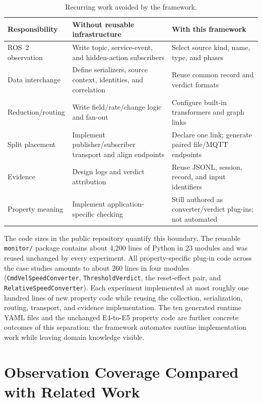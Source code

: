 \begin{table}[htbp]
\centering
\caption{Recurring work avoided by the framework.}
\label{tab:work-saved}
\begin{tabular}{
  >{\raggedright\arraybackslash}p{}
  >{\raggedright\arraybackslash}p{}
  >{\raggedright\arraybackslash}p{}}
\toprule
\textbf{Responsibility} & \textbf{Without reusable infrastructure} &
\textbf{With this framework}\\
\midrule
ROS~2 observation & Write topic, service-event, and hidden-action subscribers &
Select source kind, name, type, and phases\\
Data interchange & Define serializers, source context, identities, and
correlation & Reuse common record and verdict formats\\
Reduction/routing & Write field/rate/change logic and fan-out &
Configure built-in transformers and graph links\\
Split placement & Implement publisher/subscriber transport and align endpoints &
Declare one link; generate paired file/MQTT endpoints\\
Evidence & Design logs and verdict attribution & Reuse JSONL, session, record,
and input identifiers\\
Property meaning & Implement application-specific checking & Still authored as
converter/verdict plug-ins; not automated\\
\bottomrule
\end{tabular}
\end{table}

The code sizes in the public repository quantify this boundary. The reusable
\texttt{monitor/} package contains about 4{,}200 lines of Python in 23 modules
and was reused unchanged by every experiment. All property-specific plug-in
code across the case studies amounts to about 260 lines in four modules
(\texttt{CmdVelSpeedConverter}, \texttt{ThresholdVerdict}, the reset-effect
pair, and \texttt{RelativeSpeedConverter}). Each experiment implemented
at most roughly one hundred lines of new property code while
reusing the collection, serialization, routing, transport, and evidence
implementation. The ten generated runtime YAML files and the unchanged
E4-to-E5 property code are further concrete outcomes of this separation: the
framework automates routine implementation work while leaving domain knowledge
visible.

\section{Observation Coverage Compared with Related Work}
\label{sec:coverage-comparison}

